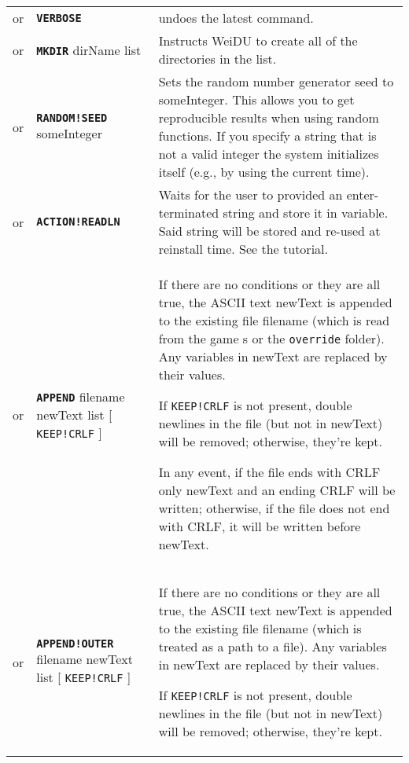 \documentclass{article}
\def\ttref#1{\ahrefloc{#1}{\tt #1}}
\def\DEFINE#1{{\tt \bf #1}\label{#1}\index{#1}}
\def\DEFSYN#1{{\tt \bf #1}\index{#1}}
\def\t#1{{\tt #1}}
\def\Slist{{\color{red} list }}
\def\Ob{{\color{red} [ }}
\def\Oe{{\color{red} ] }}
\begin{document}
\begin{tabular}{cp{10in}|p{10in}}
  or & \DEFINE{VERBOSE} & undoes the latest \ttref{SILENT} command. \\
  or & \DEFINE{MKDIR} dirName \Slist &
      Instructs WeiDU to create all of the directories in the list. \\
  or & \DEFINE{RANDOM!SEED} someInteger &
      Sets the random number generator seed to someInteger. This allows you
      to get reproducible results when using random functions. If you
      specify a string that is not a valid integer the system initializes
      itself (e.g., by using the current time).  \\
  or & \DEFINE{ACTION!READLN} \ttref{variable} &
      Waits for the user to provided an enter-terminated string and store it in
      variable. Said string will be stored and re-used at reinstall time. See the
      \ttref{READLN} tutorial. \\
or & \DEFSYN{APPEND} \ttref{optNoBackup} filename newText \ttref{when} \Slist \Ob \t{KEEP!CRLF} \Oe  &
      If there are no \ttref{when} conditions or they are all true, the
      ASCII text newText is appended to the existing file filename (which
      is read from the game \ttref{BIFF}s or the \t{override} folder).
      Any variables in newText are replaced by their values.

      If \t{KEEP!CRLF} is not present, double newlines in the file
      (but not in newText) will be removed; otherwise, they're kept.

      In any event, if the file ends with CRLF only newText and an ending
      CRLF will be written; otherwise, if the file does not end with CRLF,
      it will be written before newText.
      \\
  or & \DEFINE{APPEND!OUTER} \ttref{optNoBackup} filename newText \ttref{when} \Slist \Ob \t{KEEP!CRLF} \Oe  &
      If there are no \ttref{when} conditions or they are all true, the
      ASCII text newText is appended to the existing file filename (which
      is treated as a path to a file).
      Any variables in newText are replaced by their values.

      If \t{KEEP!CRLF} is not present, double newlines in the file
      (but not in newText) will be removed; otherwise, they're kept.


\end{tabular}
\end{document}
